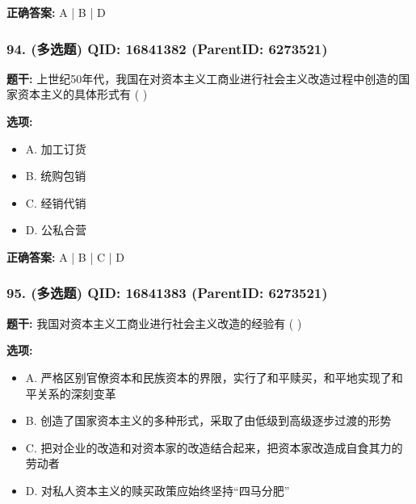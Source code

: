 \documentclass[12pt,UTF8]{ctexart}
\begin{document}
\textbf{正确答案:}
A | B | D

\vspace{0.3em}\hrulefill\vspace{0.7em}

\subsubsection*{94. (多选题) \small QID: 16841382 (ParentID: 6273521)}

\textbf{题干:}
上世纪50年代，我国在对资本主义工商业进行社会主义改造过程中创造的国家资本主义的具体形式有 ( )



\textbf{选项:}
\begin{itemize}[leftmargin=*]

  \item A. 加工订货

  \item B. 统购包销

  \item C. 经销代销

  \item D. 公私合营

\end{itemize}

\textbf{正确答案:}
A | B | C | D

\vspace{0.3em}\hrulefill\vspace{0.7em}

\subsubsection*{95. (多选题) \small QID: 16841383 (ParentID: 6273521)}

\textbf{题干:}
我国对资本主义工商业进行社会主义改造的经验有 ( )



\textbf{选项:}
\begin{itemize}[leftmargin=*]

  \item A. 严格区别官僚资本和民族资本的界限，实行了和平赎买，和平地实现了和平关系的深刻变革

  \item B. 创造了国家资本主义的多种形式，采取了由低级到高级逐步过渡的形势

  \item C. 把对企业的改造和对资本家的改造结合起来，把资本家改造成自食其力的劳动者

  \item D. 对私人资本主义的赎买政策应始终坚持“四马分肥”

\end{itemize}
\end{document}
